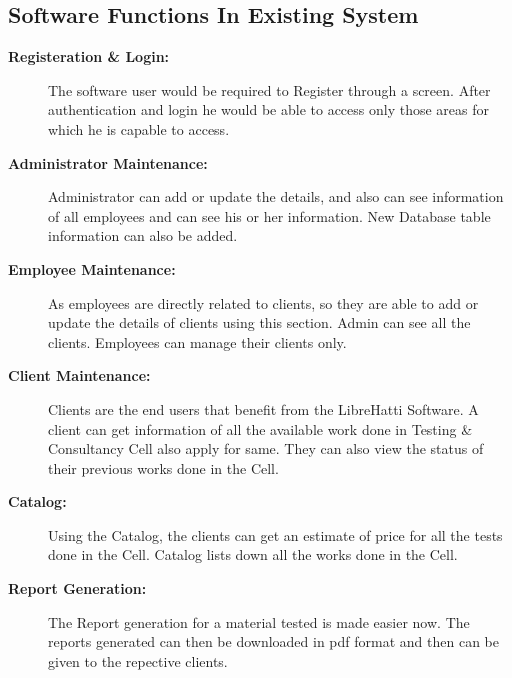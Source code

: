 \subsection{Software Functions In Existing System}
\vskip 0.5cm
\begin{description}
\item[\bf{Registeration \& Login}:]
The software user would be required to Register through a screen. After 
authentication and login he would be able to access only those areas 
for which he is capable to access.
\item[\bf{Administrator Maintenance}:]
Administrator can add or update the details, and also can see 
information of all employees and can see his or her information. New 
Database table information can also be added.
\item[\bf{Employee Maintenance}:]
As employees are directly related to clients, so they are able to add 
or update the details of clients using this section. Admin can see all 
the clients. Employees can manage their clients only.
\item[\bf{Client Maintenance}:]
Clients are the end users that benefit from the LibreHatti Software. 
A client can get information of all the available work done in Testing 
\& Consultancy Cell also apply for same. They can also view the status 
of their previous works done in the Cell.
\item[\bf{Catalog}:]
Using the Catalog, the clients can get an estimate of price for all the 
tests done in the Cell. Catalog lists down all the works done in the Cell.
\item[\bf{Report Generation}:]
The Report generation for a material tested is made easier now. The 
reports generated can then be downloaded in pdf format and then can be 
given to the repective clients.
\end{description}
